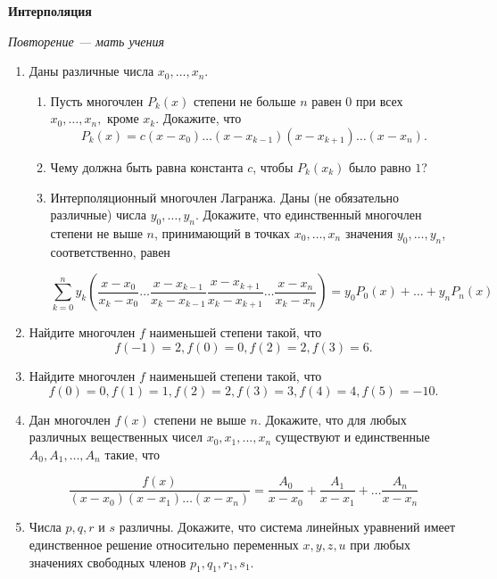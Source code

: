 \documentclass{article}
\begin{document}
\large
	

\begin{center}
\textbf{Интерполяция}
\end{center}

\epigraph{\textit{Повторение --- мать учения}}{}
\begin{enumerate}[label*=\protect\fbox{\arabic{enumi}}]
\item Даны различные числа $x_0, \dotsc , x_n.$
\begin{enumerate}
	\item Пусть многочлен $P_k(x)$ степени не больше $n$ равен $0$ при всех $x_0, \dotsc , x_n,$
	кроме $x_k$. Докажите, что $$P_k(x) = c(x - x_0)\dotsc(x - x_{k-1})(x - x_{k+1})\dotsc(x - x_n).$$
	
	\item Чему должна быть равна константа $c$, чтобы $P_k(x_k)$ было равно $1$?
	
	\item Интерполяционный многочлен Лагранжа. Даны (не обязательно различные) числа $y_0, \dotsc , y_n$. Докажите, что единственный многочлен степени не
	выше $n$, принимающий в точках $x_0, \dotsc , x_n$ значения $y_0, \dotsc , y_n$, соответственно,
	равен
	
	$$\sum_{k = 0}^{n} y_k \left(\frac{x - x_0}{x_k - x_0}  \dotsc  \frac{x - x_{k-1}}{x_k - x_{k-1}} \frac{x - x_{k+1}}{x_k - x_{k+1}} \dotsc \frac{x - x_{n}}{x_k - x_{n}}\right) = y_0P_0(x) + \dotsc + y_nP_n(x)$$
 \end{enumerate}

\item Найдите многочлен $f$ наименьшей степени такой, что $$f(-1) = 2, f(0) = 0, f(2) = 2, f(3) = 6.$$

\item Найдите многочлен $f$ наименьшей степени такой, что $$f(0) = 0, f(1) = 1, f(2) = 2, f(3) = 3, f(4) = 4, f(5) = -10.$$

\item Дан многочлен $f(x)$ степени не выше $n$. Докажите, что для любых различных вещественных чисел $x_0, x_1, . . . , x_n$ существуют и единственные $A_0, A_1, \dotsc , A_n$ такие, что

$$\frac{f(x)}{(x - x_0)(x-x_1)\dotsc(x-x_n)} = \frac{A_0}{x-x_0} + \frac{A_1}{x-x_1} + \dotsc \frac{A_n}{x-x_n}$$

\item Числа $p, q, r$ и $s$ различны. Докажите, что система линейных уравнений
имеет единственное решение относительно переменных $x, y, z, u$ при любых значениях свободных членов $p_1, q_1, r_1, s_1.$


\end{enumerate}
\end{document}
